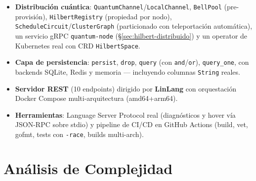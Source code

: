 \documentclass[12pt, a4paper, openany]{report}
\theoremstyle{definition}
\newcommand{\linlang}{\textbf{LinLang}}
\begin{document}
\begin{itemize}
  \item \textbf{Distribución cuántica}: \texttt{QuantumChannel}/\texttt{LocalChannel}, \texttt{BellPool} (pre-provisión), \texttt{HilbertRegistry} (propiedad por nodo), \texttt{ScheduleCircuit}/\texttt{ClusterGraph} (particionado con teleportación automática), un servicio gRPC \texttt{quantum-node} (\S\ref{sec:hilbert-distribuido}) y un operator de Kubernetes real con CRD \texttt{HilbertSpace}.
  \item \textbf{Capa de persistencia}: \texttt{persist}, \texttt{drop}, \texttt{query} (con \texttt{and}/\texttt{or}), \texttt{query\_one}, con backends SQLite, Redis y memoria — incluyendo columnas \texttt{String} reales.
  \item \textbf{Servidor REST} (10 endpoints) dirigido por \linlang{} con orquestación Docker Compose multi-arquitectura (amd64+arm64).
  \item \textbf{Herramientas}: Language Server Protocol real (diagnósticos y hover vía JSON-RPC sobre stdio) y pipeline de CI/CD en GitHub Actions (build, vet, gofmt, tests con \texttt{-race}, builds multi-arch).
\end{itemize}

\section{Análisis de Complejidad}
\label{sec:complejidad}
\end{document}
